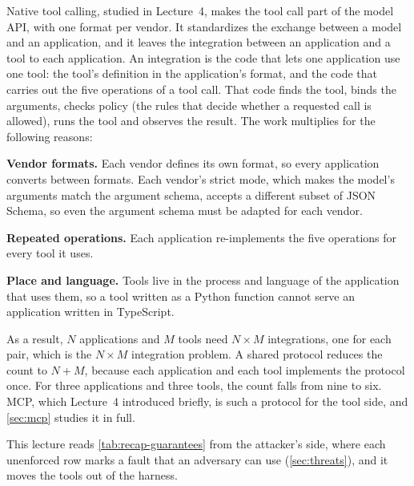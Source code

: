 Native tool calling, studied in Lecture~4, makes the tool call part of the model API, with one
format per vendor. It standardizes the exchange between a model and an application, and it leaves
the integration between an application and a tool to each application. An integration is the code
that lets one application use one tool: the tool's definition in the application's format, and the
code that carries out the five operations of a tool call. That code finds the tool, binds the
arguments, checks policy (the rules that decide whether a requested call is allowed), runs the tool
and observes the result. The work multiplies for the following reasons:
\bi
\item \textbf{Vendor formats.} Each vendor defines its own format, so every application converts
between formats. Each vendor's strict mode, which makes the model's arguments match the argument
schema, accepts a different subset of JSON Schema, so even the argument schema must be adapted for
each vendor.
\item \textbf{Repeated operations.} Each application re-implements the five operations for every
tool it uses.
\item \textbf{Place and language.} Tools live in the process and language of the application that
uses them, so a tool written as a Python function cannot serve an application written in
TypeScript.
\ei

As a result, $N$ applications and $M$ tools need $N \times M$ integrations, one for each pair, which
is the $N \times M$ integration problem. A shared protocol reduces the count to $N + M$, because
each application and each tool implements the protocol once. For three applications and three
tools, the count falls from nine to six. MCP, which Lecture~4 introduced
briefly, is such a protocol for the tool side, and \cref{sec:mcp} studies it in full.

This lecture reads \cref{tab:recap-guarantees} from the attacker's side, where each unenforced row
marks a fault that an adversary can use (\cref{sec:threats}), and it moves the tools out of the
harness.
